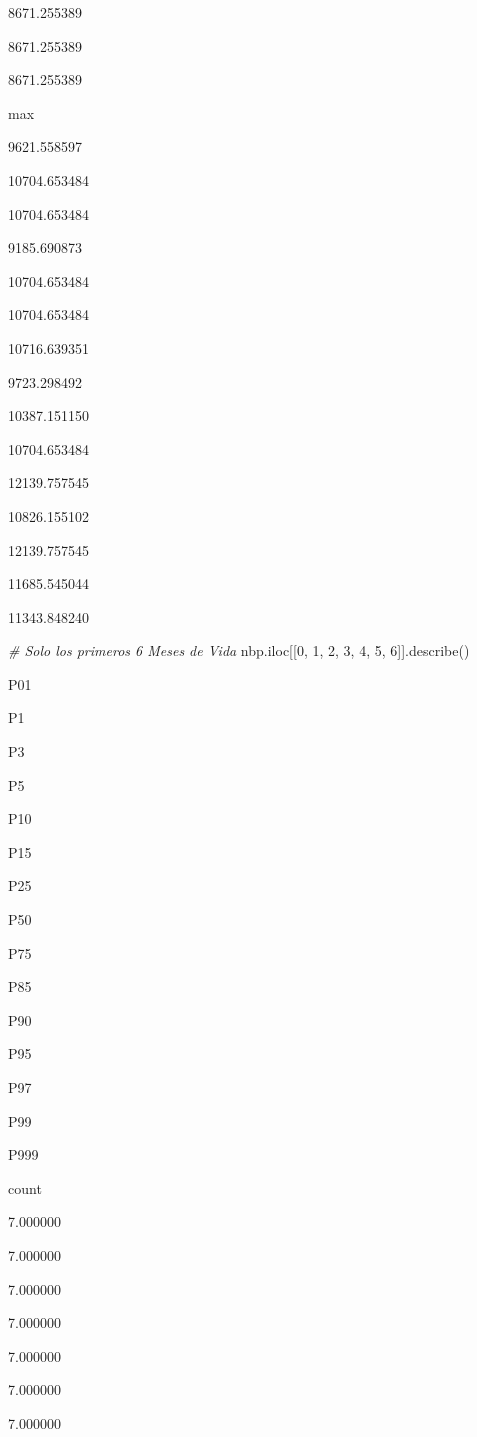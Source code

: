 \documentclass[
]{article}
\newenvironment{Shaded}{\begin{snugshade}}{\end{snugshade}}
\newcommand{\CommentTok}[1]{\textcolor[rgb]{0.56,0.35,0.01}{\textit{#1}}}
\newcommand{\DecValTok}[1]{\textcolor[rgb]{0.00,0.00,0.81}{#1}}
\newcommand{\NormalTok}[1]{#1}
\begin{document}
8671.255389

8671.255389

8671.255389

max

9621.558597

10704.653484

10704.653484

9185.690873

10704.653484

10704.653484

10716.639351

9723.298492

10387.151150

10704.653484

12139.757545

10826.155102

12139.757545

11685.545044

11343.848240

\begin{Shaded}
\begin{Highlighting}[]
\CommentTok{\# Solo los primeros 6 Meses de Vida}
\NormalTok{nbp.iloc[[}\DecValTok{0}\NormalTok{, }\DecValTok{1}\NormalTok{, }\DecValTok{2}\NormalTok{, }\DecValTok{3}\NormalTok{, }\DecValTok{4}\NormalTok{, }\DecValTok{5}\NormalTok{, }\DecValTok{6}\NormalTok{]].describe()}
\end{Highlighting}
\end{Shaded}

P01

P1

P3

P5

P10

P15

P25

P50

P75

P85

P90

P95

P97

P99

P999

count

7.000000

7.000000

7.000000

7.000000

7.000000

7.000000

7.000000
\end{document}
